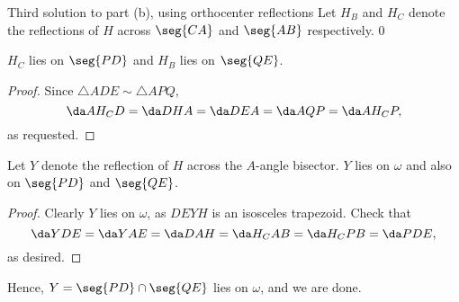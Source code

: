\begin{customenv}{Third solution to part (b), using orthocenter reflections}
    Let $H_B$ and $H_C$ denote the reflections of $H$ across $\seg{CA}$ and $\seg{AB}$ respectively.
    \setcounter{iclaim}0
    \begin{iclaim}
        $H_C$ lies on $\seg{PD}$ and $H_B$ lies on $\seg{QE}$.
    \end{iclaim}
    \begin{proof}
        Since $\triangle ADE\sim\triangle APQ$, $$\da AH_CD=\da DHA=\da DEA=\da AQP=\da AH_CP,$$
        as requested.
    \end{proof}
    \begin{iclaim}
        Let $Y$ denote the reflection of $H$ across the $A$-angle bisector. $Y$ lies on $\omega$ and also on $\seg{PD}$ and $\seg{QE}$.
    \end{iclaim}
    \begin{proof}
        Clearly $Y$ lies on $\omega$, as $DEYH$ is an isosceles trapezoid. Check that $$\da YDE=\da YAE=\da DAH=\da H_CAB=\da H_CPB=\da PDE,$$
        as desired.
    \end{proof}

    Hence, $Y=\seg{PD}\cap\seg{QE}$ lies on $\omega$, and we are done. 
\end{customenv}

